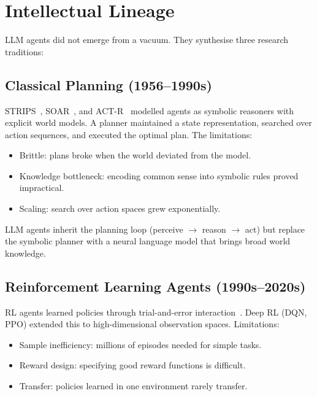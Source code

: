 
\section{Intellectual Lineage}

LLM agents did not emerge from a vacuum. They synthesise three research traditions:

\subsection{Classical Planning (1956--1990s)}

STRIPS~\cite{wohlman1977strips}, SOAR~\cite{laird1987soar}, and ACT-R~\cite{anderson1996actr} modelled agents as symbolic reasoners with explicit world models. A planner maintained a state representation, searched over action sequences, and executed the optimal plan. The limitations:
\begin{itemize}
	\item Brittle: plans broke when the world deviated from the model.
	\item Knowledge bottleneck: encoding common sense into symbolic rules proved impractical.
	\item Scaling: search over action spaces grew exponentially.
\end{itemize}

LLM agents inherit the planning loop (perceive $\to$ reason $\to$ act) but replace the symbolic planner with a neural language model that brings broad world knowledge.

\subsection{Reinforcement Learning Agents (1990s--2020s)}

RL agents learned policies through trial-and-error interaction~\cite{sutton1998rl}. Deep RL (DQN, PPO) extended this to high-dimensional observation spaces. Limitations:
\begin{itemize}
	\item Sample inefficiency: millions of episodes needed for simple tasks.
	\item Reward design: specifying good reward functions is difficult.
	\item Transfer: policies learned in one environment rarely transfer.
\end{itemize}

